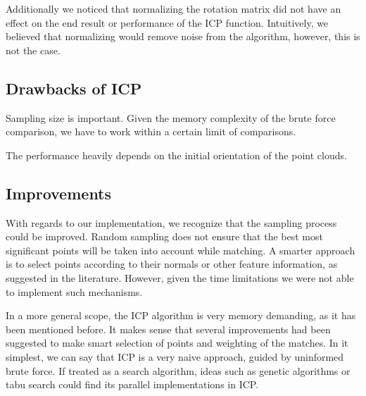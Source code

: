 \documentclass[11pt]{article}
\begin{document}
Additionally we noticed that normalizing the rotation matrix did not have an effect on the end result or performance of the ICP function. Intuitively, we believed that normalizing would remove noise from the algorithm, however, this is not the case. 

\subsection{Drawbacks of ICP}
Sampling size is important. Given the memory complexity of the brute force comparison, we have to work within a certain limit of comparisons.

The performance heavily depends on the initial orientation of the point clouds. 
 
 
\subsection{Improvements}
With regards to our implementation, we recognize that the sampling process could be improved. Random sampling does not ensure that the best most significant points will be taken into account while matching. A smarter approach is to select points according to their normals or other feature information, as suggested in the literature. However, given the time limitations we were not able to implement such mechanisms.

In a more general scope, the ICP algorithm is very memory demanding, as it has been mentioned before. It makes sense that several improvements had been suggested to make smart selection of points and weighting of the matches. In it simplest, we can say that ICP is a very naive approach, guided by uninformed brute force. If treated as a search algorithm, ideas such as genetic algorithms or tabu search could find its parallel implementations in ICP.
\end{document}
